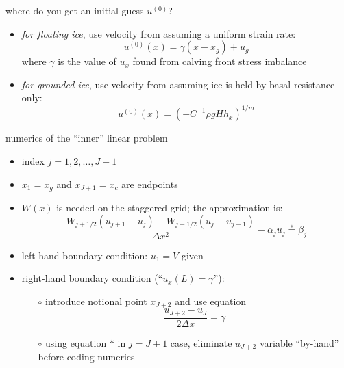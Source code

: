\begin{frame}{where do you get an initial guess $u^{(0)}$?}

\begin{itemize}
\item \emph{for floating ice}, use velocity from assuming a uniform strain rate:
   $$u^{(0)}(x) = \gamma (x-x_g) + u_g$$
where $\gamma$ is the value of $u_x$ found from calving front stress imbalance
\item \emph{for grounded ice}, use velocity from assuming ice is held by basal resistance only:
   $$u^{(0)}(x) = \left(-C^{-1} \rho g H h_x\right)^{1/m}$$
\end{itemize}
\end{frame}


\begin{frame}{numerics of the ``inner'' linear problem}

\begin{itemize}
\item index $j=1,2,\dots,J+1$
\item $x_1 = x_g$ and $x_{J+1} = x_c$ are endpoints
\item $W(x)$ is needed on the staggered grid; the approximation is:
$$\frac{W_{j+1/2} (u_{j+1} - u_j) - W_{j-1/2} (u_{j} - u_{j-1})}{\Delta x^2} - \alpha_j u_j \stackrel{\ast}{=} \beta_j$$
\item left-hand boundary condition: $u_1 = V$ given
\item right-hand boundary condition (``$u_x(L)=\gamma$''):
  \begin{itemize}
  \item[$\circ$] introduce notional point $x_{J+2}$ and use equation
    $$\frac{u_{J+2} - u_J}{2 \Delta x} = \gamma$$
  \item[$\circ$] using equation $\ast$ in $j=J+1$ case, eliminate $u_{J+2}$ variable ``by-hand'' before coding numerics
  \end{itemize}
\end{itemize}
\end{frame}


